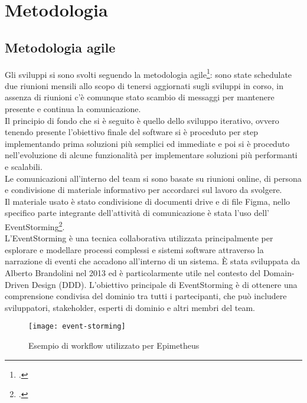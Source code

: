 \chapter{Metodologia}
\label{cap:metodologia}


\section{Metodologia agile}
\label{sec:metodologia-agile}

Gli sviluppi si sono svolti seguendo la metodologia agile\footcite{womak:agile-manifesto}: sono state schedulate due riunioni mensili allo scopo di tenersi aggiornati sugli sviluppi in corso, in assenza di riunioni c'è comunque stato scambio di messaggi per mantenere presente e continua la comunicazione.\\
Il principio di fondo che si è seguito è quello dello sviluppo iterativo, ovvero tenendo presente l'obiettivo finale del software si è proceduto per step implementando prima soluzioni più semplici ed immediate e poi si è proceduto nell'evoluzione di alcune funzionalità per implementare soluzioni più performanti e scalabili. \\

Le comunicazioni all'interno del team si sono basate su riunioni online, di persona e condivisione di materiale informativo per accordarci sul lavoro da svolgere.\\
Il materiale usato è stato condivisione di documenti drive e di file Figma, nello specifico parte integrante dell'attività di comunicazione è stata l'uso dell' EventStorming\footcite{womak:event-storming}.\\
L'EventStorming è una tecnica collaborativa utilizzata principalmente per esplorare e modellare processi complessi e sistemi software attraverso la narrazione di eventi che accadono all'interno di un sistema. È stata sviluppata da Alberto Brandolini nel 2013 ed è particolarmente utile nel contesto del Domain-Driven Design (DDD). L'obiettivo principale di EventStorming è di ottenere una comprensione condivisa del dominio tra tutti i partecipanti, che può includere sviluppatori, stakeholder, esperti di dominio e altri membri del team.

\begin{figure}[!ht] 
    \centering 
    \texttt{[image: event-storming]} 
    \caption{Esempio di workflow utilizzato per Epimetheus}
\end{figure}

